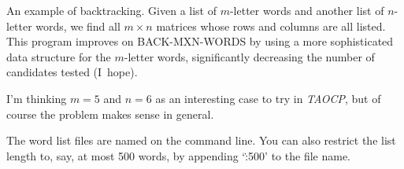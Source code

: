 
\hypertextrue\srcloctrue

An example of backtracking. Given a list of
$m$-letter words and another
list of $n$-letter words, we find all $m\times n$ matrices whose rows and
columns are all listed. This program improves on {\mc BACK-MXN-WORDS}
by using a more sophisticated data structure for the $m$-letter words,
significantly decreasing the number of candidates tested (I~hope).

I'm thinking $m=5$ and $n=6$ as an interesting case to try in {\sl TAOCP},
but of course the problem makes sense in general.

The word list files are named on the command line. You can also restrict
the list length to, say, at most 500 words, by appending `\.{:500}' to
the file name.

